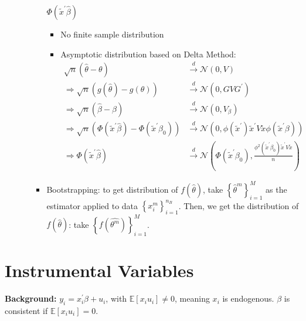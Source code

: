 \begin{enumerate}
\begin{itemize}
\begin{itemize}
\begin{eg}
                    $\Phi (\tilde{x}^{\prime} \hat{\beta})$
                    \begin{itemize}
                        \item No finite sample distribution
                        \item Asymptotic distribution based on Delta Method:
                        \begin{align*}
                            \sqrt{n}(\hat{\theta} - \theta) &\xrightarrow{d} \mathcal{N}(0, V) \\
                            \Rightarrow \sqrt{n} \left(g(\hat{\theta}) - g(\theta)\right) &\xrightarrow{d} \mathcal{N}(0, G V G^{\prime}) \\
                            \Rightarrow \sqrt{n}(\hat{\beta} - \beta ) &\xrightarrow{d} \mathcal{N}(0, V_{\beta}) \\
                            \Rightarrow \sqrt{n}\left(\Phi(\tilde{x}^{\prime} \hat{\beta}) - \Phi(\tilde{x}^{\prime} \beta_0) \right) &\xrightarrow{d} \mathcal{N}\left(0, \phi(\tilde{x}^{\prime}) \tilde{x}^{\prime} V \tilde{x} \phi(\tilde{x}^{\prime} \beta)\right) \\
                            \Rightarrow \Phi(\tilde{x}^{\prime} \hat{\beta}) &\xrightarrow{d} \mathcal{N}\left(\Phi(\tilde{x}^{\prime} \beta_0), \frac{\phi^{2}(\tilde{x}^{\prime} \beta_0) \tilde{x}^{\prime} V \tilde{x}}{n}\right)
                        \end{align*}
                    \end{itemize}
                \end{eg}
            \item Bootstrapping: to get distribution of $f(\hat{\theta})$, take $\left\{ \hat{\theta}^m \right\}_{i=1}^{M}$ as the estimator applied to data $\left\{ x_i^{m} \right\}_{i=1}^{n_B}$.
                Then, we get the distribution of $f(\hat{\theta})$: take $\left\{ f(\hat{\theta^m}) \right\}_{i=1}^{M}$.
        \end{itemize}
    \end{itemize}
\end{enumerate}

\section{Instrumental Variables}

\textbf{Background:} $y_i = x_i^{\prime} \beta + u_i$, with $\mathbb{E}[x_i u_i] \neq 0$, meaning $x_i$ is endogenous.
$\beta$ is consistent if $\mathbb{E}[x_i u_i] = 0$.

